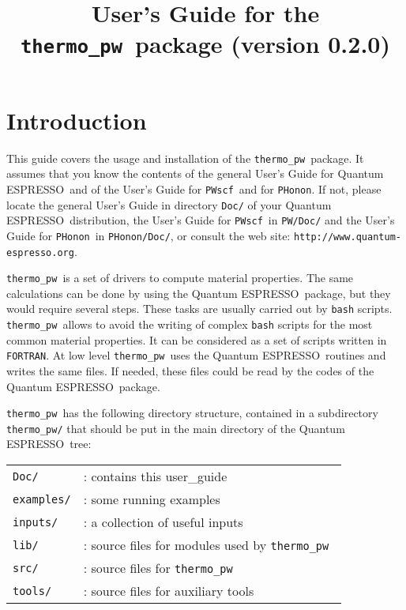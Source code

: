 \documentclass[12pt,a4paper]{article}
\def\version{0.2.0}
\def\qe{{\sc Quantum ESPRESSO}}
\def\PWscf{\texttt{PWscf}}
\def\PHonon{\texttt{PHonon}}
\def\thermo{\texttt{thermo\_pw}}
\begin{document}
 
\author{}
\date{}

\def\qeImage{../../Doc/quantum_espresso.pdf}
\def\democritosImage{../../Doc/democritos.pdf}
\def\SissaImage{./sissa.pdf}

\title{
  \vskip 1cm
  \Huge User's Guide for the \thermo\ package \smallskip
  \Large (version \version)
}

\maketitle

\tableofcontents

\section{Introduction}

This guide covers the usage and installation of the \thermo\ package. 
It assumes that you know the contents of the general User's Guide for \qe\ 
and of the User's Guide for \PWscf\ and for \PHonon. 
If not, please locate the general User's Guide in directory 
\texttt{Doc/} of your \qe\ distribution,
the User's Guide for \PWscf\ in \texttt{PW/Doc/} and the User's Guide
for \PHonon\ in \texttt{PHonon/Doc/}, or consult the web site:
\texttt{http://www.quantum-espresso.org}.

\thermo\ is a set of drivers to compute material properties. 
The same calculations can be done by using the \qe\ package, but they would 
require several steps. These tasks are usually carried out by \texttt{bash}
scripts. \thermo\ allows to avoid the writing of complex \texttt{bash}
scripts for the most common material properties. It can be considered as a set 
of scripts written in \texttt{FORTRAN}. At low level \thermo\ uses the \qe\ 
routines and writes the same files. If needed, these files could be read
by the codes of the \qe\ package. 

\thermo\ has the following directory structure, contained in a subdirectory 
\texttt{thermo\_pw/} that should be put in the main directory of the \qe\ tree:

\begin{tabular}{ll}
\texttt{Doc/}      & : contains this user\_guide \\
\texttt{examples/} & : some running examples \\
\texttt{inputs/}   & : a collection of useful inputs \\
\texttt{lib/}      & : source files for modules used by \thermo\ \\
\texttt{src/}      & : source files for \thermo\ \\
\texttt{tools/}    & : source files for auxiliary tools \\
\end{tabular}\\
\end{document}
